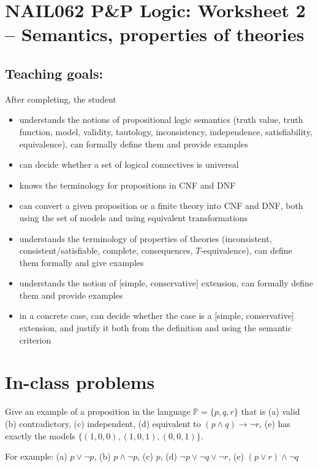 \section*{NAIL062 P\&P Logic: Worksheet 2 -- Semantics, properties of theories}

\subsection*{Teaching goals:} After completing, the student

    \begin{itemize}\setlength{\itemsep}{0pt}
        \item understands the notions of propositional logic semantics (truth value, truth function, model, validity, tautology, inconsistency, independence, satisfiability, equivalence), can formally define them and provide examples
        \item can decide whether a set of logical connectives is universal
        \item knows the terminology for propositions in CNF and DNF
        \item can convert a given proposition or a finite theory into CNF and DNF, both using the set of models and using equivalent transformations
        \item understands the terminology of properties of theories (inconsistent, consistent/satisfiable, complete, consequences, $T$-equivalence), can define them formally and give examples
        \item understands the notion of [simple, conservative] extension, can formally define them and provide examples
        \item in a concrete case, can decide whether the case is a [simple, conservative] extension, and justify it both from the definition and using the semantic criterion
    \end{itemize}



\section*{In-class problems}


\begin{problem}

    Give an example of a proposition in the language $\mathbb P=\{p,q,r\}$ that is (a) valid (b) contradictory, (c) independent, (d) equivalent to $(p\wedge q)\to\neg r$, (e) has exactly the models $\{(1,0,0),(1,0,1),(0,0,1)\}$.


    \begin{solution}
        For example: (a) $p\lor\neg p$, (b) $p\land\neg p$, (c) $p$, (d) $\neg p\lor\neg q\lor\neg r$, (e) $(p\lor r)\land\neg q$            
    \begin{flushright}\qedsymbol\end{flushright}
    \end{solution}

\end{problem}


